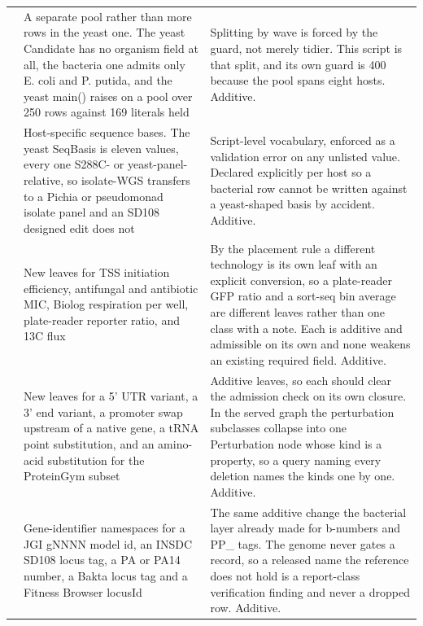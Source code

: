 \begin{longtable}{@{}L{50mm} L{48mm} L{74mm}@{}}
\addlinespace[5pt]
 & A separate pool rather than more rows in the yeast one. The yeast Candidate has no organism field at all, the bacteria one admits only E. coli and P. putida, and the yeast main() raises on a pool over 250 rows against 169 literals held & Splitting by wave is forced by the guard, not merely tidier. This script is that split, and its own guard is 400 because the pool spans eight hosts. Additive. \\
\addlinespace[5pt]
 & Host-specific sequence bases. The yeast SeqBasis is eleven values, every one S288C- or yeast-panel-relative, so isolate-WGS transfers to a Pichia or pseudomonad isolate panel and an SD108 designed edit does not & Script-level vocabulary, enforced as a validation error on any unlisted value. Declared explicitly per host so a bacterial row cannot be written against a yeast-shaped basis by accident. Additive. \\
\addlinespace[5pt]
 & New leaves for TSS initiation efficiency, antifungal and antibiotic MIC, Biolog respiration per well, plate-reader reporter ratio, and 13C flux & By the placement rule a different technology is its own leaf with an explicit conversion, so a plate-reader GFP ratio and a sort-seq bin average are different leaves rather than one class with a note. Each is additive and admissible on its own and none weakens an existing required field. Additive. \\
\addlinespace[5pt]
 & New leaves for a 5' UTR variant, a 3' end variant, a promoter swap upstream of a native gene, a tRNA point substitution, and an amino-acid substitution for the ProteinGym subset & Additive leaves, so each should clear the admission check on its own closure. In the served graph the perturbation subclasses collapse into one Perturbation node whose kind is a property, so a query naming every deletion names the kinds one by one. Additive. \\
\addlinespace[5pt]
 & Gene-identifier namespaces for a JGI gNNNN model id, an INSDC SD108 locus tag, a PA or PA14 number, a Bakta locus tag and a Fitness Browser locusId & The same additive change the bacterial layer already made for b-numbers and PP\_ tags. The genome never gates a record, so a released name the reference does not hold is a report-class verification finding and never a dropped row. Additive. \\

\end{longtable}
